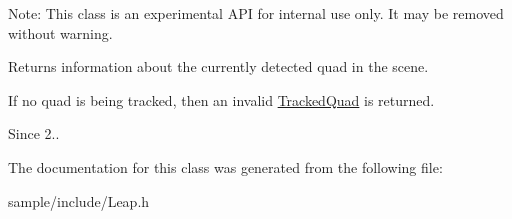 Note\+: This class is an experimental A\+PI for internal use only. It may be removed without warning.

Returns information about the currently detected quad in the scene.


\begin{DoxyCodeInclude}
\end{DoxyCodeInclude}
 If no quad is being tracked, then an invalid \hyperlink{class_leap_1_1_tracked_quad}{Tracked\+Quad} is returned. \begin{DoxySince}{Since}
2.. 
\end{DoxySince}


The documentation for this class was generated from the following file\+:\begin{DoxyCompactItemize}
\item 
sample/include/Leap.\+h\end{DoxyCompactItemize}

